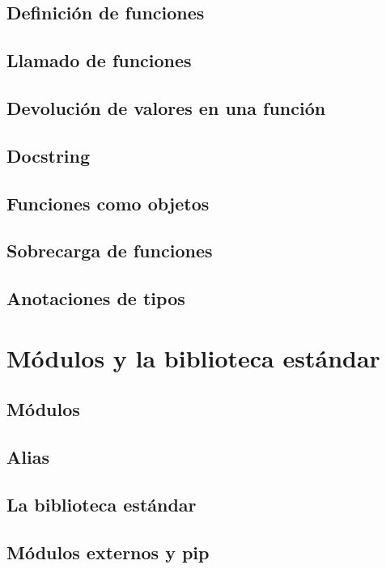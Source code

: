 \documentclass{report}
\begin{document}
\section{Definición de funciones}

\section{Llamado de funciones}

\section{Devolución de valores en una función}

\section{Docstring}

\section{Funciones como objetos}

\section{Sobrecarga de funciones}

\section{Anotaciones de tipos}

\clearpage\chapter{Módulos y la biblioteca estándar}

\section{Módulos}

\section{Alias}

\section{La biblioteca estándar}

\section{Módulos externos y pip}
\end{document}
